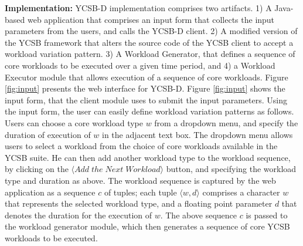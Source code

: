 \documentclass{vldb}
\begin{document}

\par \textbf{Implementation:}
 \def\tuple#1{\langle #1\rangle}
  YCSB-D implementation comprises two artifacts.
  1) A Java-based web application that comprises an input form that collects the input parameters from the users, and calls the YCSB-D client.
   2) A modified version of the YCSB framework that alters the source code of the YCSB client to accept a workload variation pattern.
       3) A Workload Generator, that defines a sequence of core workloads to be executed over a given time period, and 4) a Workload Executor module that allows execution of a sequence of core workloads. %
        Figure \ref{fig:input} presents the web interface for YCSB-D. Figure \ref{fig:input} shows the input form, that the client module uses to submit the input parameters.
         Using the input form, the user can easily define workload variation patterns as follows. Users can choose a core workload type $w$ from a dropdown menu, and specify the duration of execution of $w$ in the adjacent text box. The dropdown menu allows users to select a workload from the choice of core workloads available in the YCSB suite. He can then add another workload type to the workload sequence, by clicking on the $\langle Add\; the\; Next\; Workload\rangle$ button, and specifying the workload type and duration as above. The workload sequence is captured by the web application as a sequence $c$ of tuples; each tuple $\tuple{w,d}$ comprises a character $w$ that represents the selected workload type, and a floating point parameter $d$ that denotes the duration for the execution of $w$. The above sequence $c$ is passed to the workload generator module, which then generates a sequence of core YCSB workloads to be executed.
\end{document}
